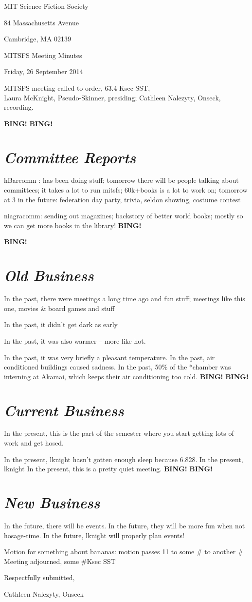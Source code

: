 \documentclass[10pt]{article}
\newcommand{\bing}{{\bf BING!} }
\newcommand{\goto}[1]{\bing \vskip 12pt \section*{{\em{#1}}}}
\newcommand{\skinner}{Laura McKnight, Pseudo-Skinner}
\newcommand{\onseck}{Cathleen Nalezyty, Onseck}
\newcommand{\meetingdate}{Friday, 26 September 2014}
\begin{document}
\begin{center}

MIT Science Fiction Society

84 Massachusetts Avenue

Cambridge, MA 02139

\vspace{12pt}

MITSFS Meeting Minutes

\meetingdate

\end{center}

\vspace{18pt}

\setlength{\parskip}{6pt}

\noindent
MITSFS meeting called to order, 63.4 Ksec SST, \\
\skinner, presiding; \onseck, recording.

\bing
\goto{Committee Reports}
hBarcomm : has been doing stuff; tomorrow there will be people talking about committees; it takes a lot to run mitsfs; 60k+books is a lot to work on; tomorrow at 3
in the future: federation day party, trivia, seldon showing, costume contest

niagracomm: sending out magazines; backstory of better world books; mostly so we can get more books in the library!
\bing

\goto{Old Business}
In the past, there were meetings a long time ago and fun stuff; meetings like this one, movies & board games and stuff

In the past, it didn't get dark as early

In the past, it was also warmer -- more like hot.
 
In the past, it was very briefly a pleasant temperature.
In the past, air conditioned buildings caused sadness.
In the past, 50\% of the *chamber was interning at Akamai, which keeps their air conditioning too cold.
\bing
\goto{Current Business}
In the present, this is the part of the semester where you start getting lots of work and get hosed.

In the present, lknight hasn't gotten enough sleep because 6.828.
In the present, lknight
In the present, this is a pretty quiet meeting.
\bing
\goto{New Business}
In the future, there will be events. 
In the future, they will be more fun when not hosage-time.
In the future, lknight will properly plan events!

\noindent
Motion for something about bananas: motion passes 11 to some # to another #
Meeting adjourned, some #Ksec SST
\noindent

\vspace{18pt}

\centerline{Respectfully submitted,}
\centerline{\onseck}
\end{document}

